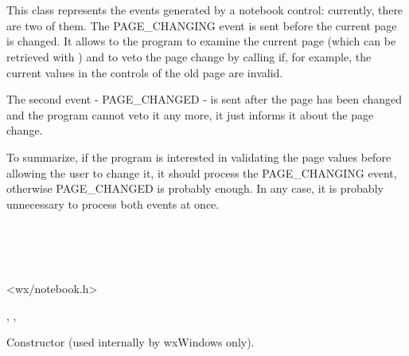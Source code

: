 \section{}\label{wxnotebookevent}

This class represents the events generated by a notebook control: currently,
there are two of them. The PAGE\_CHANGING event is sent before the current
page is changed. It allows to the program to examine the current page (which
can be retrieved with 
) and to veto the page
change by calling  if, for example, the
current values in the controls of the old page are invalid.

The second event - PAGE\_CHANGED - is sent after the page has been changed and
the program cannot veto it any more, it just informs it about the page change.

To summarize, if the program is interested in validating the page values
before allowing the user to change it, it should process the PAGE\_CHANGING
event, otherwise PAGE\_CHANGED is probably enough. In any case, it is probably
unnecessary to process both events at once.


\\
\\
\\


<wx/notebook.h>




, , 


\label{wxnotebookeventconstr}


Constructor (used internally by wxWindows only).

\label{wxnotebookeventgetoldselection}

